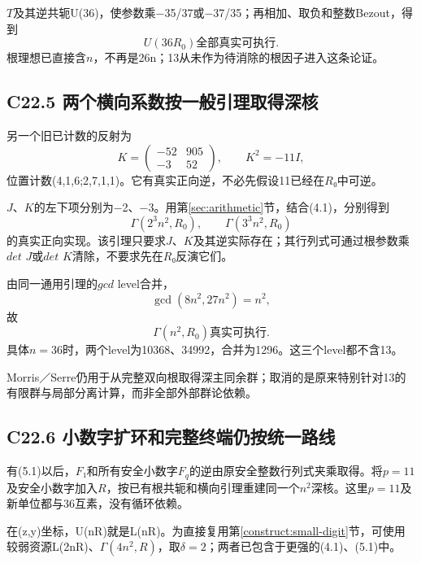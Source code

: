 {\ensuremath{T}及其逆共轭U(36)，使参数乘−35/37或−37/35；再相加、取负和整数Bezout，得到} \[
\boxed{U(36R_0)\text{全部真实可执行}.}
\tag{C22.4.1}
\] {根理想已直接含\ensuremath{n}，不再是26n；13从未作为待消除的根因子进入这条论证。}

\subsection*{\texorpdfstring{{C22.5} {两个横向系数按一般引理取得深核}}{C22.5 两个横向系数按一般引理取得深核}}\label{C22-h150}

{另一个旧已计数的反射为} \[
K=\begin{pmatrix}-52&905\\-3&52\end{pmatrix},
\qquad K^2=-11I,
\] {位置计数(4,1,6;2,7,1,1)。它有真实正向逆，不必先假设11已经在\ensuremath{R}₀中可逆。}

{\ensuremath{J}、\ensuremath{K}的左下项分别为−2、−3。用}第\ref{sec:arithmetic}节{，结合(4.1)，分别得到} \[
\Gamma(2^3n^2,R_0),\qquad
\Gamma(3^3n^2,R_0)
\] {的真实正向实现。该引理只要求\ensuremath{J}、\ensuremath{K}及其逆实际存在；其行列式可通过根参数乘\ensuremath{det}} {\ensuremath{J}或\ensuremath{det}} {\ensuremath{K}清除，不要求先在\ensuremath{R}₀反演它们。}

{由同一通用引理的\ensuremath{gcd}} {level合并，} \[
\gcd(8n^2,27n^2)=n^2,
\] {故} \[
\boxed{\Gamma(n^2,R_0)\text{真实可执行}.}
\tag{C22.5.1}
\] {具体\ensuremath{n=36}时，两个level为10368、34992，合并为1296。这三个level都不含13。}

{Morris／Serre仍用于从完整双向根取得深主同余群；取消的是原来特别针对13的有限群与局部分离计算，而非全部外部群论依赖。}

\subsection*{\texorpdfstring{{C22.6} {小数字扩环和完整终端仍按统一路线}}{C22.6 小数字扩环和完整终端仍按统一路线}}\label{C22-h151}

{有(5.1)以后，\ensuremath{F}₁和所有安全小数字\ensuremath{F_{q}}的逆由原安全整数行列式夹乘取得。将\ensuremath{p=11}及安全小数字加入\ensuremath{R}，按已有根共轭和横向引理重建同一个\ensuremath{n^{2}}深核。这里\ensuremath{p=11}及新单位都与36互素，没有循环依赖。}

{在(z,y)坐标，U(nR)就是L(nR)。为直接复用}第\ref{construct:small-digit}节{，可使用较弱资源L(2nR)、\ensuremath{\Gamma (4n^{2},R)}，取\ensuremath{\delta =2}；两者已包含于更强的(4.1)、(5.1)中。}


